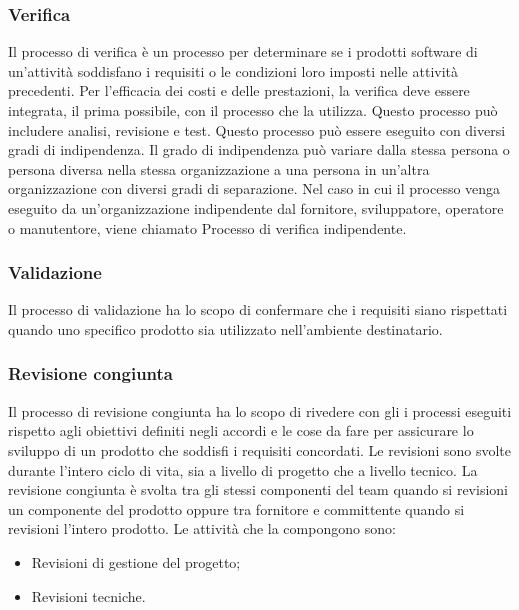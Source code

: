 \subsubsection{Verifica}
Il processo di verifica è un processo per determinare se i prodotti software di un'attività soddisfano i requisiti o le condizioni loro imposti nelle attività precedenti. Per l'efficacia dei costi e delle prestazioni, la verifica deve essere integrata, il prima possibile, con il processo che la utilizza. Questo processo può includere analisi, revisione e test. Questo processo può essere eseguito con diversi gradi di indipendenza. Il grado di indipendenza può variare dalla stessa persona o persona diversa nella stessa organizzazione a una persona in un'altra organizzazione con diversi gradi di separazione. Nel caso in cui il processo venga eseguito da un'organizzazione indipendente dal fornitore, sviluppatore, operatore o manutentore, viene chiamato Processo di verifica indipendente.

\subsubsection{Validazione}
Il processo di validazione ha lo scopo di confermare che i requisiti siano rispettati quando uno specifico prodotto sia utilizzato nell'ambiente destinatario.

\subsubsection{Revisione congiunta}
Il processo di revisione congiunta ha lo scopo di rivedere con gli  i processi eseguiti rispetto agli obiettivi definiti negli accordi e le cose da fare per assicurare lo sviluppo di un prodotto che soddisfi i requisiti concordati.
Le revisioni sono svolte durante l'intero ciclo di vita, sia a livello di progetto che a livello tecnico.
La revisione congiunta è svolta tra gli stessi componenti del team quando si revisioni un componente del prodotto oppure tra fornitore e committente quando si revisioni l'intero prodotto. 
Le attività che la compongono sono:
\begin{itemize}

	\item Revisioni di gestione del progetto;
	
	\item Revisioni tecniche.

\end{itemize}

